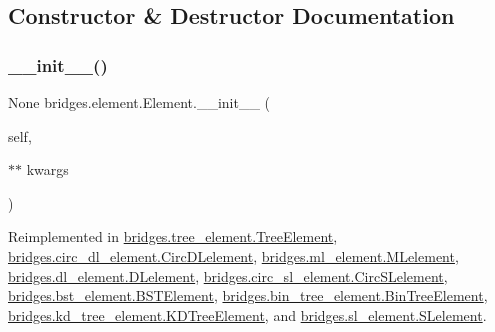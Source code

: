 \subsection{Constructor \& Destructor Documentation}
\mbox{\label{classbridges_1_1element_1_1_element_a59432b0af6594a2c8b57602eb8fc4906}} 
\subsubsection{\texorpdfstring{\_\_init\_\_()}{\_\_init\_\_()}}
{\footnotesize\ttfamily  None bridges.\+element.\+Element.\+\_\+\+\_\+init\+\_\+\+\_\+ (\begin{DoxyParamCaption}\item[{}]{self,  }\item[{$\ast$$\ast$}]{kwargs }\end{DoxyParamCaption})}



Reimplemented in \mbox{\hyperlink{classbridges_1_1tree__element_1_1_tree_element_aec95cc1608f0c741ddd7e7a63174f3b7}{bridges.\+tree\+\_\+element.\+Tree\+Element}}, \mbox{\hyperlink{classbridges_1_1circ__dl__element_1_1_circ_d_lelement_a6db1440877da650713f41a3450377d49}{bridges.\+circ\+\_\+dl\+\_\+element.\+Circ\+D\+Lelement}}, \mbox{\hyperlink{classbridges_1_1ml__element_1_1_m_lelement_abd5ccc3a5438e2ed1812be381f4fb8a4}{bridges.\+ml\+\_\+element.\+M\+Lelement}}, \mbox{\hyperlink{classbridges_1_1dl__element_1_1_d_lelement_a159beec2192949eb33d5b4b6dba182ff}{bridges.\+dl\+\_\+element.\+D\+Lelement}}, \mbox{\hyperlink{classbridges_1_1circ__sl__element_1_1_circ_s_lelement_a3885ad93ae1368cfef8296ace0ab22c8}{bridges.\+circ\+\_\+sl\+\_\+element.\+Circ\+S\+Lelement}}, \mbox{\hyperlink{classbridges_1_1bst__element_1_1_b_s_t_element_a0be9b75a1da9322d40811669d13e05a4}{bridges.\+bst\+\_\+element.\+B\+S\+T\+Element}}, \mbox{\hyperlink{classbridges_1_1bin__tree__element_1_1_bin_tree_element_a4c50812c9a43aa5cd75ccc46b818a8b2}{bridges.\+bin\+\_\+tree\+\_\+element.\+Bin\+Tree\+Element}}, \mbox{\hyperlink{classbridges_1_1kd__tree__element_1_1_k_d_tree_element_ad48f0bdabbb21cf83782efc1f8dbc1ed}{bridges.\+kd\+\_\+tree\+\_\+element.\+K\+D\+Tree\+Element}}, and \mbox{\hyperlink{classbridges_1_1sl__element_1_1_s_lelement_a0824caaa305931953bf3f6d53d3a3d14}{bridges.\+sl\+\_\+element.\+S\+Lelement}}.



